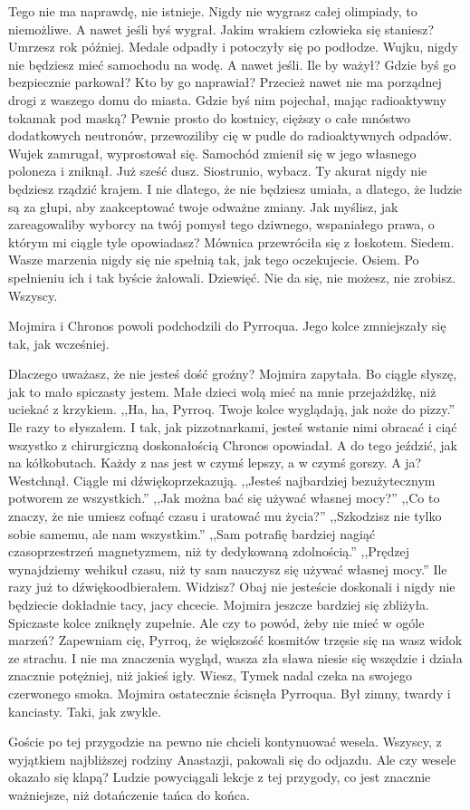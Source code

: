 \begin{dialogue}
\ds{} Tego nie ma naprawdę, nie istnieje.
Nigdy nie wygrasz całej olimpiady, to niemożliwe.
A nawet jeśli byś wygrał. Jakim wrakiem człowieka się staniesz?
Umrzesz rok później.
\dm{} Medale odpadły i potoczyły się po podłodze. \dm{}
Wujku, nigdy nie będziesz mieć samochodu na wodę. A nawet jeśli.
Ile by ważył? Gdzie byś go bezpiecznie parkował? Kto by go naprawiał?
Przecież nawet nie ma porządnej drogi z waszego domu do miasta.
Gdzie byś nim pojechał, mając radioaktywny tokamak pod maską?
Pewnie prosto do kostnicy, cięższy o całe mnóstwo dodatkowych neutronów, przewoziliby cię w pudle do radioaktywnych odpadów.
\dm{} Wujek zamrugał, wyprostował się. Samochód zmienił się w jego własnego poloneza i zniknął. Już sześć dusz. \dm{}
Siostrunio, wybacz. Ty akurat nigdy nie będziesz rządzić krajem. I nie dlatego, że nie będziesz umiała, a dlatego, że ludzie są za głupi, aby zaakceptować 
twoje odważne zmiany. Jak myślisz, jak zareagowaliby wyborcy na twój pomysł tego dziwnego, wspaniałego prawa, o którym mi ciągle tyle opowiadasz?
\dm{} Mównica przewróciła się z łoskotem. Siedem. \dm{}
Wasze marzenia nigdy się nie spełnią tak, jak tego oczekujecie. \dm{} Osiem. \dm{}
Po spełnieniu ich i tak byście żałowali. \dm{} Dziewięć. \dm{}
Nie da się, nie możesz, nie zrobisz. \dm{} Wszyscy.
\end{dialogue}

Mojmira i Chronos powoli podchodzili do Pyrroqua. Jego kolce zmniejszały się tak, jak wcześniej.

\begin{dialogue}
\ds{} Dlaczego uważasz, że nie jesteś dość groźny? \dm{} Mojmira zapytała.
\ds{} Bo ciągle słyszę, jak to mało spiczasty jestem. Małe dzieci wolą mieć na mnie przejażdżkę, niż uciekać z krzykiem.
,,Ha, ha, Pyrroq. Twoje kolce wyglądają, jak noże do pizzy.'' Ile razy to słyszałem.
\ds{} I tak, jak pizzotnarkami, jesteś wstanie nimi obracać i ciąć wszystko z chirurgiczną doskonałością \dm{} Chronos opowiadał. \dm{} A do tego jeździć, jak na kółkobutach.
Każdy z nas jest w czymś lepszy, a w czymś gorszy. A ja? \dm{} Westchnął. \dm{} Ciągle mi dźwiękoprzekazują. 
,,Jesteś najbardziej bezużytecznym potworem ze wszystkich.'' 
,,Jak można bać się używać własnej mocy?'' ,,Co to znaczy, że nie umiesz cofnąć czasu i uratować mu życia?''
,,Szkodzisz nie tylko sobie samemu, ale nam wszystkim.''
,,Sam potrafię bardziej nagiąć czasoprzestrzeń magnetyzmem, niż ty dedykowaną zdolnością.''
,,Prędzej wynajdziemy wehikuł czasu, niż ty sam nauczysz się używać własnej mocy.'' Ile razy już to dźwiękoodbierałem.
\ds{} Widzisz? Obaj nie jesteście doskonali i nigdy nie będziecie dokładnie tacy, jacy chcecie. \dm{} Mojmira jeszcze bardziej się zbliżyła.
Spiczaste kolce zniknęły zupełnie. \dm{} Ale czy to powód, żeby nie mieć w ogóle marzeń?
Zapewniam cię, Pyrroq, że większość kosmitów trzęsie się na wasz widok ze strachu. 
I nie ma znaczenia wygląd, wasza zła sława niesie się wszędzie i działa znacznie potężniej, niż jakieś igły.
Wiesz, Tymek nadal czeka na swojego czerwonego smoka.
\dm{} Mojmira ostatecznie ścisnęła Pyrroqua. 
Był zimny, twardy i kanciasty. Taki, jak zwykle.
\end{dialogue}

Goście po tej przygodzie na pewno nie chcieli kontynuować wesela. 
Wszyscy, z wyjątkiem najbliższej rodziny Anastazji, pakowali się do odjazdu.
Ale czy wesele okazało się klapą? Ludzie powyciągali lekcje z tej przygody, co jest znacznie ważniejsze, niż dotańczenie tańca do końca.


